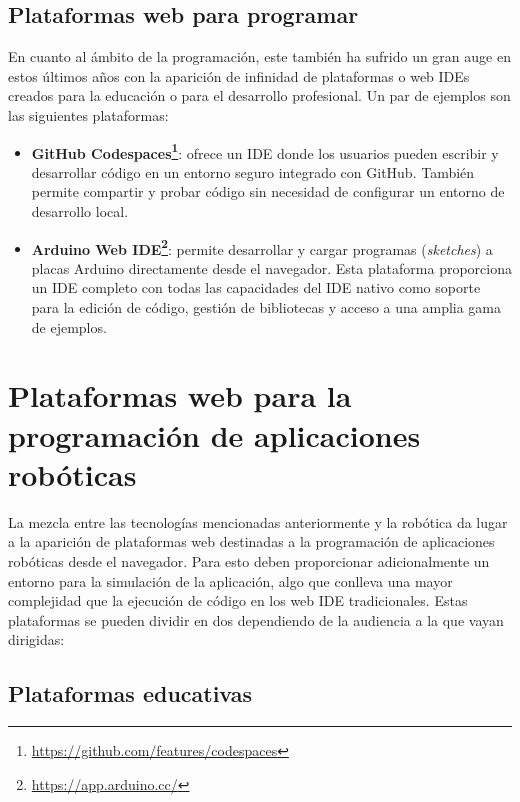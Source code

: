 \subsection{Plataformas web para programar}

En cuanto al ámbito de la programación, este también ha sufrido un gran auge en estos últimos años con la aparición de infinidad de plataformas o web IDEs creados para la educación o para el desarrollo profesional. Un par de ejemplos son las siguientes plataformas: 

\begin{itemize}

    \item \textbf{GitHub Codespaces\footnote{\url{https://github.com/features/codespaces}}}: ofrece un IDE donde los usuarios pueden escribir y desarrollar código en un entorno seguro integrado con GitHub. También permite compartir y probar código sin necesidad de configurar un entorno de desarrollo local.

    \item \textbf{Arduino Web IDE\footnote{\url{https://app.arduino.cc/}}}: permite desarrollar y cargar programas (\textit{sketches}) a placas Arduino directamente desde el navegador. Esta plataforma proporciona un IDE completo con todas las capacidades del IDE nativo como soporte para la edición de código, gestión de bibliotecas y acceso a una amplia gama de ejemplos.
    
\end{itemize}

\section{Plataformas web para la programación de aplicaciones robóticas}

La mezcla entre las tecnologías mencionadas anteriormente y la robótica da lugar a la aparición de plataformas web destinadas a la programación de aplicaciones robóticas desde el navegador. Para esto deben proporcionar adicionalmente un entorno para la simulación de la aplicación, algo que conlleva una mayor complejidad que la ejecución de código en los web IDE tradicionales. Estas plataformas se pueden dividir en dos dependiendo de la audiencia a la que vayan dirigidas:

\subsection{Plataformas educativas}


